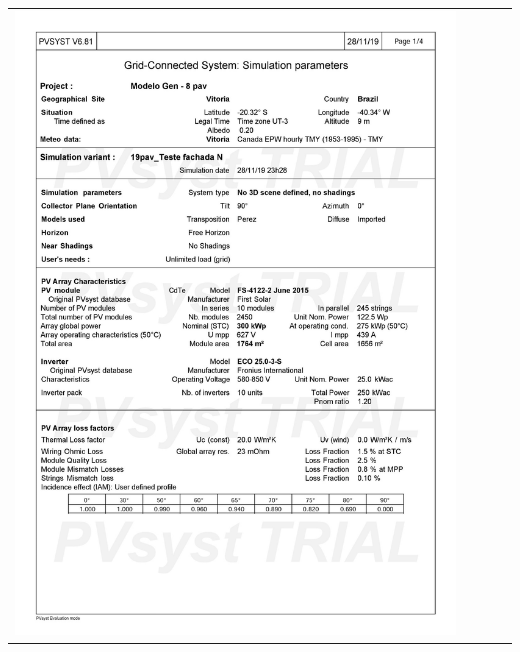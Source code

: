 \begin{table}[H]
    \centering
    \begin{tabular}{l}
        \includegraphics[width=0.9\textwidth]{figures/attachments/resultpv25.jpg}
    \end{tabular}
\end{table}
\pagebreak
